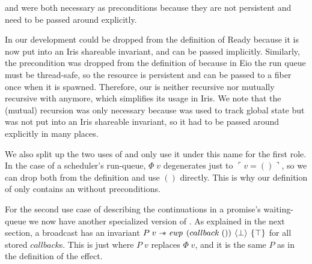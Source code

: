 \gsPInv{} and \gsIsQueue{} were both necessary as preconditions because they are not persistent and need to be passed around explicitly.

In our development \gsPInv{} could be dropped from the definition of Ready because it is now put into an Iris shareable invariant, and can be passed implicitly.
Similarly, the \gsIsQueue{} precondition was dropped from the definition of \gsReady{} because in Eio the run queue must be thread-safe, so the \gsIsQueue{} resource is persistent and can be passed to a fiber once when it is spawned.
Therefore, our \gsReady{} is neither recursive nor mutually recursive with \gsPInv{} anymore, which simplifies its usage in Iris.
We note that the (mutual) recursion was only necessary because \gsPInv{} was used to track global state but was not put into an Iris shareable invariant, so it had to be passed around explicitly in many places.

We also split up the two uses of \gsReady{} and only use it under this name for the first role.
In the case of a scheduler's run-queue, \(Φ\; v\) degenerates just to \(\ulcorner v = () \urcorner\), so we can drop both from the definition and use \(()\) directly.
This is why our definition of \gsReady{} only contains an \ewpt{} without preconditions.

For the second use case of describing the continuations in a promise's waiting-queue we now have another specialized version of \gsReady{}.
As explained in the next section, a broadcast has an invariant \(P\; v \wand \ewp{callback\; ()}{\bot}{\top}\) for all stored \(callback\)s.
This is just \gsReady{} where \(P\; v\) replaces \(Φ\; v\), and it is the same \(P\) as in the definition of the \esuspend{} effect.
